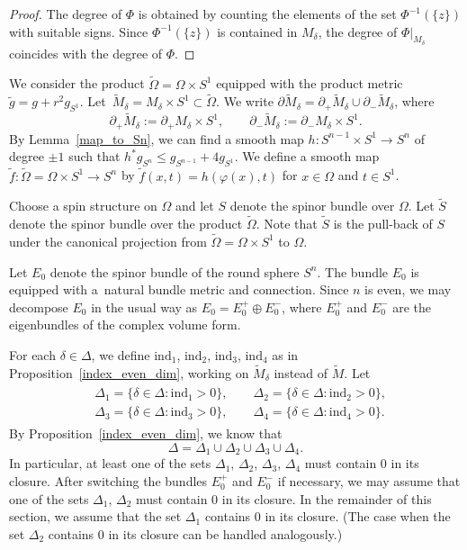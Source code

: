 \documentclass[pdftex]{sigma}
\numberwithin{equation}{section}
\begin{document}
\begin{proof}
The degree of $\Phi$ is obtained by counting the elements of the set $\Phi^{-1}(\{z\})$ with suitable signs.
Since $\Phi^{-1}(\{z\})$ is contained in $M_\delta$, the degree of $\Phi|_{M_\delta}$ coincides with the degree of $\Phi$.
\end{proof}


We consider the product $\tilde{\Omega} = \Omega \times S^1$ equipped with the product metric $\tilde{g} = g + r^2 g_{S^1}$.
Let~$\tilde{M}_\delta = M_\delta \times S^1 \subset \tilde{\Omega}$.
We write $\partial \tilde{M}_\delta = \partial_+ \tilde{M}_\delta \cup \partial_- \tilde{M}_\delta$, where
\[\partial_+ \tilde{M}_\delta := \partial_+ M_\delta \times S^1, \qquad \partial_- \tilde{M}_\delta := \partial_- M_\delta \times S^1.\]
By Lemma~\ref{map_to_Sn}, we can find a smooth map $h\colon S^{n-1} \times S^1 \to S^n$ of degree $\pm 1$ such that $h^* g_{S^n} \leq g_{S^{n-1}} + 4 g_{S^1}$.
We define a smooth map $\tilde{f}\colon \tilde{\Omega} = \Omega \times S^1 \to S^n$ by
$\tilde{f}(x,t) = h(\varphi(x),t)$
for $x \in \Omega$ and $t \in S^1$.

Choose a spin structure on $\Omega$ and let $S$ denote the spinor bundle over $\Omega$. Let $\tilde{S}$ denote the spinor bundle over the product $\tilde{\Omega}$.
Note that $\tilde{S}$ is the pull-back of $S$ under the canonical projection from $\tilde{\Omega} = \Omega \times S^1$ to $\Omega$.

Let $E_0$ denote the spinor bundle of the round sphere $S^n$.
The bundle $E_0$ is equipped with a~natural bundle metric and connection.
Since $n$ is even, we may decompose $E_0$ in the usual way as $E_0 = E_0^+ \oplus E_0^-$, where $E_0^+$ and $E_0^-$ are the eigenbundles of the complex volume form.

For each $\delta \in \Delta$, we define $\mathrm{ind}_1$, $\mathrm{ind}_2$, $\mathrm{ind}_3$, $\mathrm{ind}_4$ as in Proposition~\ref{index_even_dim}, working on $\tilde{M}_\delta$ instead of $\tilde{M}$.
Let
\begin{gather*}
\begin{split}
&\Delta_1 = \{\delta \in \Delta\colon \mathrm{ind}_1 > 0\}, \qquad
\Delta_2 = \{\delta \in \Delta\colon \mathrm{ind}_2 > 0\}, \\
& \Delta_3 = \{\delta \in \Delta\colon \mathrm{ind}_3 > 0\}, \qquad
\Delta_4 = \{\delta \in \Delta\colon \mathrm{ind}_4 > 0\}.
\end{split}
\end{gather*}
By Proposition~\ref{index_even_dim}, we know that
\[
\Delta = \Delta_1 \cup \Delta_2 \cup \Delta_3 \cup \Delta_4.
\]
In particular, at least one of the sets $\Delta_1$, $\Delta_2$, $\Delta_3$, $\Delta_4$ must contain $0$ in its closure.
After switching the bundles $E_0^+$ and $E_0^-$ if necessary, we may assume that one of the sets $\Delta_1$, $\Delta_2$ must contain $0$ in its closure.
In the remainder of this section, we assume that the set $\Delta_1$ contains $0$ in its closure.
(The case when the set $\Delta_2$ contains $0$ in its closure can be handled analogously.)
\end{document}
